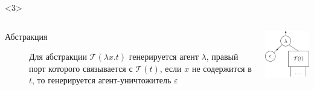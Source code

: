 \documentclass
  [ russian
  , aspectratio=169 %
  ] {beamer}
\begin{document}
\begin{frame}
    \begin{onlyenv}<3>
        \begin{columns}[totalwidth=\textwidth]
            \begin{column}{0.6\linewidth}
                \begin{description}
                    \item[Абстракция] Для абстракции $\mathcal{T}(\lambda x.t)$ генерируется агент $\lambda$, правый порт которого связывается с $\mathcal{T}(t)$, если $x$ не содержится в $t$, то генерируется агент-уничтожитель $\varepsilon$
                \end{description}
            \end{column}
            \begin{column}{0.4\linewidth}
                \begin{center}
                    \includegraphics[width=0.5\linewidth]{figures/sinot_abs_2.pdf}
                \end{center}
            \end{column}
        \end{columns}
    \end{onlyenv}
\end{frame}
\end{document}
